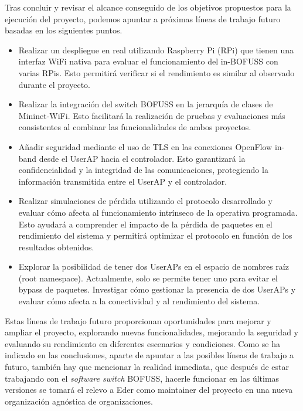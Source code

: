 Tras concluir y revisar el alcance conseguido de los objetivos propuestos para la ejecución del proyecto, podemos apuntar a próximas líneas de trabajo futuro basadas en los siguientes puntos.
\begin{itemize}
    \item Realizar un despliegue en real utilizando Raspberry Pi (RPi) que tienen una interfaz WiFi nativa para evaluar el funcionamiento del in-BOFUSS con varias RPis. Esto permitirá verificar si el rendimiento es similar al observado durante el proyecto.

    \item Realizar la integración del switch BOFUSS en la jerarquía de clases de Mininet-WiFi. Esto facilitará la realización de pruebas y evaluaciones más consistentes al combinar las funcionalidades de ambos proyectos.

    \item Añadir seguridad mediante el uso de TLS en las conexiones OpenFlow in-band desde el UserAP hacia el controlador. Esto garantizará la confidencialidad y la integridad de las comunicaciones, protegiendo la información transmitida entre el UserAP y el controlador.

    \item Realizar simulaciones de pérdida utilizando el protocolo desarrollado y evaluar cómo afecta al funcionamiento intrínseco de la operativa programada. Esto ayudará a comprender el impacto de la pérdida de paquetes en el rendimiento del sistema y permitirá optimizar el protocolo en función de los resultados obtenidos.

    \item Explorar la posibilidad de tener dos UserAPs en el espacio de nombres raíz (root namespace). Actualmente, solo se permite tener uno para evitar el bypass de paquetes. Investigar cómo gestionar la presencia de dos UserAPs y evaluar cómo afecta a la conectividad y al rendimiento del sistema.
\end{itemize}

Estas líneas de trabajo futuro proporcionan oportunidades para mejorar y ampliar el proyecto, explorando nuevas funcionalidades, mejorando la seguridad y evaluando su rendimiento en diferentes escenarios y condiciones. Como se ha indicado en las conclusiones, aparte de apuntar a las posibles líneas de trabajo a futuro, también hay que mencionar la realidad inmediata, que después de estar trabajando con el \textit{software switch} BOFUSS, hacerle funcionar en las últimas versiones se tomará el relevo a Eder como maintainer del proyecto en una nueva organización agnóstica de organizaciones.


